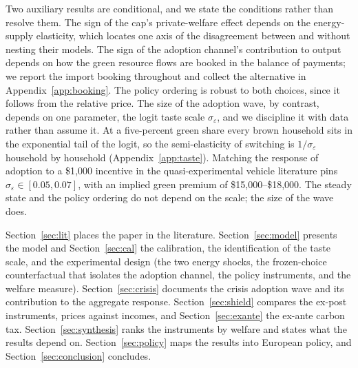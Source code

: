 Two auxiliary results are conditional, and we state the conditions rather than
resolve them. The sign of the cap's private-welfare effect depends on the
energy-supply elasticity, which locates one axis of the disagreement between
\citet{langot2026tariff} and \citet{bayer2026hank} without nesting their models. The sign
of the adoption channel's contribution to output depends on how the green
resource flows are booked in the balance of payments; we report the import
booking throughout and collect the alternative in Appendix~\ref{app:booking}.
The policy ordering is robust to both choices, since it follows from the
relative price. The size of the adoption wave, by contrast, depends on one
parameter, the logit taste scale $\sigma_\varepsilon$, and we discipline it with
data rather than assume it. At a five-percent green share every brown household
sits in the exponential tail of the logit, so the semi-elasticity of switching
is $1/\sigma_\varepsilon$ household by household (Appendix~\ref{app:taste}).
Matching the response of adoption to a \$1{,}000 incentive in the
quasi-experimental vehicle literature \citep{GallagherMuehlegger2011,
Chandra2010, MuehleggerRapson2022} pins $\sigma_\varepsilon\in[0.05,0.07]$, with
an implied green premium of \$15{,}000--\$18{,}000. The steady state and the
policy ordering do not depend on the scale; the size of the wave does.

Section~\ref{sec:lit} places the paper in the literature.
Section~\ref{sec:model} presents the model and Section~\ref{sec:cal} the
calibration, the identification of the taste scale, and the experimental design (the
two energy shocks, the frozen-choice counterfactual that isolates the adoption
channel, the policy instruments, and the welfare measure). Section~\ref{sec:crisis} documents the
crisis adoption wave and its contribution to the aggregate response.
Section~\ref{sec:shield} compares the ex-post instruments, prices against incomes,
and Section~\ref{sec:exante} the ex-ante carbon tax. Section~\ref{sec:synthesis}
ranks the instruments by welfare and states what the results depend on.
Section~\ref{sec:policy} maps the results into European policy, and
Section~\ref{sec:conclusion} concludes.
